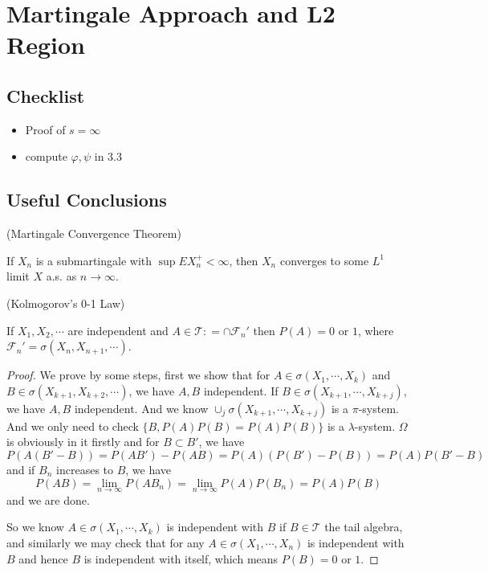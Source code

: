\section{Martingale Approach and L2 Region}

\subsection{Checklist}

\begin{itemize}
    \item Proof of $s = \infty$
    \item compute $\varphi, \psi$ in 3.3
\end{itemize}

\subsection{Useful Conclusions}

\begin{theorem}
    (Martingale Convergence Theorem)\par
    If $X_n$ is a submartingale with $\sup EX_n^+ < \infty$, then $X_n$ converges to some $L^1$ limit $X$ a.s. as $n\to\infty$.
\end{theorem}

\begin{theorem}
    (Kolmogorov's 0-1 Law)\par
    If $X_1,X_2,\cdots$ are independent and $A \in \mathcal{T}: = \cap \mathcal{F}_n'$ then $P(A) = 0$ or $1$, where $\mathcal{F}_n' = \sigma(X_n, X_{n+1},\cdots)$.
\end{theorem}
\begin{proof}
    We prove by some steps, first we show that for $A \in \sigma(X_1,\cdots,X_k)$ and $B\in \sigma(X_{k+1},X_{k+2},\cdots)$, we have $A, B$ independent. If $B\in \sigma(X_{k+1},\cdots,X_{k+j})$, we have $A,B$ independent. And we know $\cup_j \sigma(X_{k+1},\cdots,X_{k+j})$ is a $\pi$-system. And we only need to check $\{B, P(A)P(B) = P(A)P(B)\}$ is a $\lambda$-system. $\Omega$ is obviously in it firstly and for $B\subset B'$, we have
    \[
    P(A(B'-B)) = P(AB')-P(AB) = P(A)(P(B')-P(B)) = P(A)P(B'-B)
    \]
    and if $B_n$ increases to $B$, we have
    \[
    P(AB) = \lim_{n\to\infty}P(AB_n) = \lim_{n\to\infty} P(A)P(B_n) = P(A)P(B)
    \]
    and we are done.\par
    So we know $A\in\sigma(X_1,\cdots,X_k)$ is independent with $B$ if $B \in \mathcal{T}$ the tail algebra, and similarly we may check that for any $A\in\sigma(X_1,\cdots,X_n)$ is independent with $B$ and hence $B$ is independent with itself, which means $P(B) = 0$ or $1$.\par  
\end{proof}

